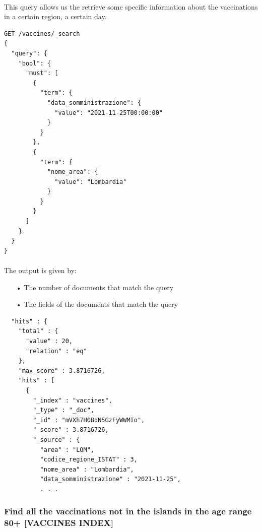 \documentclass[a4paper,12pt]{article}
\begin{document}
\paragraph{} This query allows us the retrieve some specific information about the vaccinations in a certain region, a certain day.
\begin{tcolorbox}[colback=green!5!white,colframe=green!75!black,title=QUERY]
\begin{verbatim}
GET /vaccines/_search
{
  "query": {
    "bool": {
      "must": [
        {
          "term": {
            "data_somministrazione": {
              "value": "2021-11-25T00:00:00"
            }
          }
        },
        {
          "term": {
            "nome_area": {
              "value": "Lombardia"
            }
          }
        }
      ]
    }
  }
}
\end{verbatim}
\end{tcolorbox}
\newpage

\paragraph{} The output is given by: 
\begin{itemize}[noitemsep]
\item[•] The number of documents that match the query
\item[•] The fields of the documents that match the query
\end{itemize}
\begin{tcolorbox}[colback=red!5!white,colframe=red!75!black,title=OUTPUT]
\begin{verbatim}
  "hits" : {
    "total" : {
      "value" : 20,
      "relation" : "eq"
    },
    "max_score" : 3.8716726,
    "hits" : [
      {
        "_index" : "vaccines",
        "_type" : "_doc",
        "_id" : "mVXh7H0BdN5GzFyWWMIo",
        "_score" : 3.8716726,
        "_source" : {
          "area" : "LOM",
          "codice_regione_ISTAT" : 3,
          "nome_area" : "Lombardia",
          "data_somministrazione" : "2021-11-25",
          . . .
\end{verbatim}
\end{tcolorbox}
\newpage

\subsubsection{Find all the vaccinations not in the islands in the age range 80+ [VACCINES INDEX]}
\end{document}
